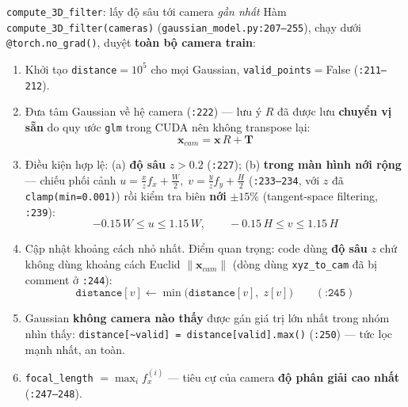 \begin{frame}{\texttt{compute\_3D\_filter}: lấy độ sâu tới camera \textit{gần nhất}}
\footnotesize
Hàm \texttt{compute\_3D\_filter(cameras)} (\texttt{gaussian\_model.py:207--255}), chạy dưới \texttt{@torch.no\_grad()}, duyệt \textbf{toàn bộ camera train}:
\begin{enumerate}
    \item Khởi tạo \texttt{distance}$=10^5$ cho mọi Gaussian, \texttt{valid\_points}$=$False (\texttt{:211--212}).
    \item Đưa tâm Gaussian về hệ camera (\texttt{:222}) --- lưu ý $R$ đã được lưu \textbf{chuyển vị sẵn} do quy ước \texttt{glm} trong CUDA nên không transpose lại:
    \[
        \mathbf{x}_{cam} = \mathbf{x}\,R + \mathbf{T}
    \]
    \item Điều kiện hợp lệ: (a) \textbf{độ sâu} $z>0.2$ (\texttt{:227}); (b) \textbf{trong màn hình nới rộng} --- chiếu phối cảnh $u=\frac{x}{z}f_x+\frac{W}{2},\; v=\frac{y}{z}f_y+\frac{H}{2}$ (\texttt{:233--234}, với $z$ đã \texttt{clamp(min=0.001)}) rồi kiểm tra biên \textbf{nới} $\pm 15\%$ (tangent-space filtering, \texttt{:239}):
    \[
        -0.15\,W \le u \le 1.15\,W, \qquad -0.15\,H \le v \le 1.15\,H
    \]
    \item Cập nhật khoảng cách nhỏ nhất. Điểm quan trọng: code dùng \textbf{độ sâu} $z$ chứ không dùng khoảng cách Euclid $\lVert \mathbf{x}_{cam}\rVert$ (dòng dùng \texttt{xyz\_to\_cam} đã bị comment ở \texttt{:244}):
    \[
        \texttt{distance}[v] \leftarrow \min\big(\texttt{distance}[v],\; z[v]\big) \qquad (\texttt{:245})
    \]
    \item Gaussian \textbf{không camera nào thấy} được gán giá trị lớn nhất trong nhóm nhìn thấy: \texttt{distance[\textasciitilde valid] = distance[valid].max()} (\texttt{:250}) --- tức lọc mạnh nhất, an toàn.
    \item \texttt{focal\_length} $=\max_i f_x^{(i)}$ --- tiêu cự của camera \textbf{độ phân giải cao nhất} (\texttt{:247--248}).
\end{enumerate}
\end{frame}

